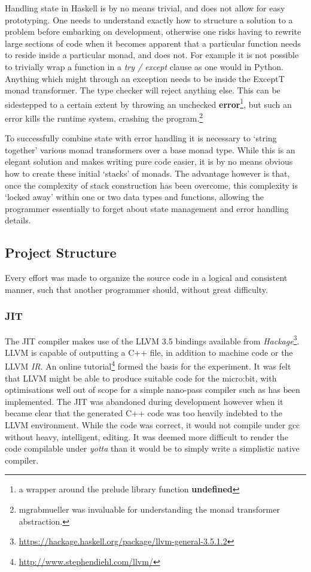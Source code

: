 \documentclass[12pt, a4paper]{report}
\begin{document}
Handling state in Haskell is by no means trivial, and does not allow for easy prototyping. One needs
to understand exactly how to structure a solution to a problem before embarking on development,
otherwise one risks having to rewrite large sections of code when it becomes apparent that a
particular function needs to reside inside a particular monad, and does not. For example it is not
possible to trivially wrap a function in a \textit{try / except} clause as one would in Python.
Anything which might through an exception needs to be inside the ExceptT monad transformer. The type
checker will reject anything else. This can be sidestepped to a certain extent by throwing an
unchecked \textbf{error}\footnote{a wrapper around the prelude library function \textbf{undefined}},
but such an error kills the runtime system, crashing the program.\footnote{mgrabmueller was
invaluable for understanding the monad transformer abstraction.}

To successfully combine state with error handling it is necessary to `string together' various monad
transformers over a base monad type. While this is an elegant solution and makes writing pure code
easier, it is by no means obvious how to create these initial `stacks' of monads. The advantage
however is that, once the complexity of stack construction has been overcome, this complexity is
`locked away' within one or two data types and functions, allowing the programmer essentially to
forget about state management and error handling details. 

\subsection{Project Structure}
Every effort was made to organize the source code in a logical and consistent manner, such that
another programmer should, without great difficulty. \\


\subsubsection{JIT}
The JIT compiler makes use of the LLVM 3.5 bindings available from
\textit{Hackage}\footnote{\url{https://hackage.haskell.org/package/llvm-general-3.5.1.2}}. LLVM is
capable of outputting a C++ file, in addition to machine code or the LLVM \textit{IR}. An online
tutorial\footnote{\url{http://www.stephendiehl.com/llvm/}} formed the basis for the experiment. It
was felt that LLVM might be able to produce suitable code for the micro:bit, with optimisations well
out of scope for a simple nano-pass compiler such as has been implemented. The JIT was abandoned
during development however when it became clear that the generated C++ code was too heavily indebted
to the LLVM environment. While the code was correct, it would not compile under gcc without heavy,
intelligent, editing. It was deemed more difficult to render the code compilable under
\textit{yotta} than it would be to simply write a simplistic native compiler.
\end{document}
